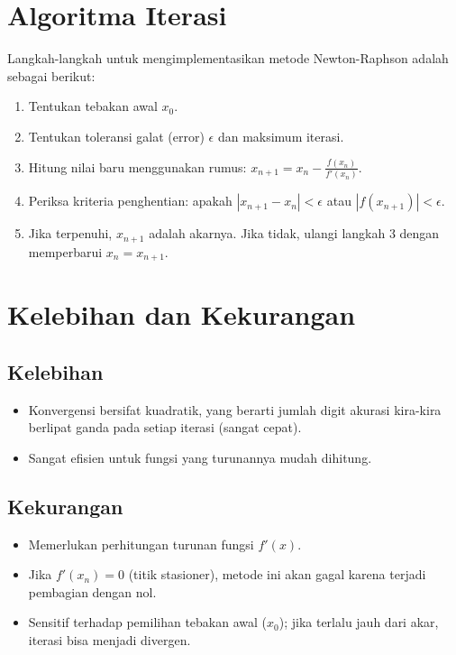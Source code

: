 \documentclass[12pt,a4paper]{article}
\begin{document}
\section{Algoritma Iterasi}
Langkah-langkah untuk mengimplementasikan metode Newton-Raphson adalah sebagai berikut:
\begin{enumerate}
  \item Tentukan tebakan awal $x_0$.
  \item Tentukan toleransi galat (error) $\epsilon$ dan maksimum iterasi.
  \item Hitung nilai baru menggunakan rumus: $x_{n+1} = x_n - \frac{f(x_n)}{f'(x_n)}$.
  \item Periksa kriteria penghentian: apakah $|x_{n+1} - x_n| < \epsilon$ atau $|f(x_{n+1})| < \epsilon$.
  \item Jika terpenuhi, $x_{n+1}$ adalah akarnya. Jika tidak, ulangi langkah 3 dengan memperbarui $x_n = x_{n+1}$.
\end{enumerate}

\section{Kelebihan dan Kekurangan}
\subsection{Kelebihan}
\begin{itemize}
  \item Konvergensi bersifat kuadratik, yang berarti jumlah digit akurasi kira-kira berlipat ganda pada setiap iterasi (sangat cepat).
  \item Sangat efisien untuk fungsi yang turunannya mudah dihitung.
\end{itemize}

\subsection{Kekurangan}
\begin{itemize}
  \item Memerlukan perhitungan turunan fungsi $f'(x)$.
  \item Jika $f'(x_n) = 0$ (titik stasioner), metode ini akan gagal karena terjadi pembagian dengan nol.
  \item Sensitif terhadap pemilihan tebakan awal ($x_0$); jika terlalu jauh dari akar, iterasi bisa menjadi divergen.
\end{itemize}
\end{document}
